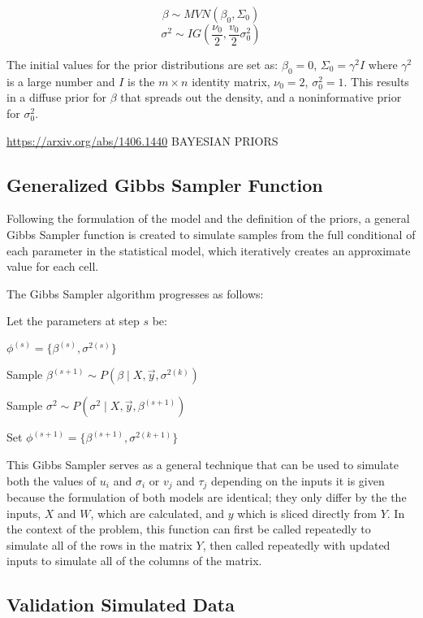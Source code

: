 \documentclass[12pt,twoside]{dukestatscithesis}
\theoremstyle{definition}
\theoremstyle{definition}
\theoremstyle{definition}
\theoremstyle{remark}
\begin{document}
\[\beta \sim MVN (\beta_0, \Sigma_0)\]
\[\sigma^2 \sim IG (\frac{\nu_0}{2}, \frac{v_0}{2}\sigma_0^2)\]

The initial values for the prior distributions are set as:
\(\beta_0 = 0\), \(\Sigma_0 = \gamma^2I\) where \(\gamma^2\) is a large
number and \(I\) is the \(m \times n\) identity matrix, \(\nu_0 = 2\),
\(\sigma_0^2 = 1\). This results in a diffuse prior for \(\beta\) that
spreads out the density, and a noninformative prior for \(\sigma^2_0\).

\url{https://arxiv.org/abs/1406.1440} BAYESIAN PRIORS

\subsection{Generalized Gibbs Sampler
Function}\label{generalized-gibbs-sampler-function}

Following the formulation of the model and the definition of the priors,
a general Gibbs Sampler function is created to simulate samples from the
full conditional of each parameter in the statistical model, which
iteratively creates an approximate value for each cell.

The Gibbs Sampler algorithm progresses as follows:

Let the parameters at step \(s\) be:

\(\phi^{(s)} = \{\beta^{(s)}, \sigma^{2(s)}\}\)

Sample \(\beta^{(s+1)} \sim P(\beta \mid X, \vec{y}, \sigma^{2(k)})\)

Sample \(\sigma^2 \sim P(\sigma^2 \mid X, \vec{y}, \beta^{(s+1)})\)

Set \(\phi^{(s+1)} = \{\beta^{(s+1)}, \sigma^{2(k+1)}\}\)

This Gibbs Sampler serves as a general technique that can be used to
simulate both the values of \(u_i\) and \(\sigma_i\) or \(v_j\) and
\(\tau_j\) depending on the inputs it is given because the formulation
of both models are identical; they only differ by the the inputs, \(X\)
and \(W\), which are calculated, and \(y\) which is sliced directly from
\(Y\). In the context of the problem, this function can first be called
repeatedly to simulate all of the rows in the matrix \(Y\), then called
repeatedly with updated inputs to simulate all of the columns of the
matrix.

\subsection{Validation Simulated Data}\label{validation-simulated-data}
\end{document}
